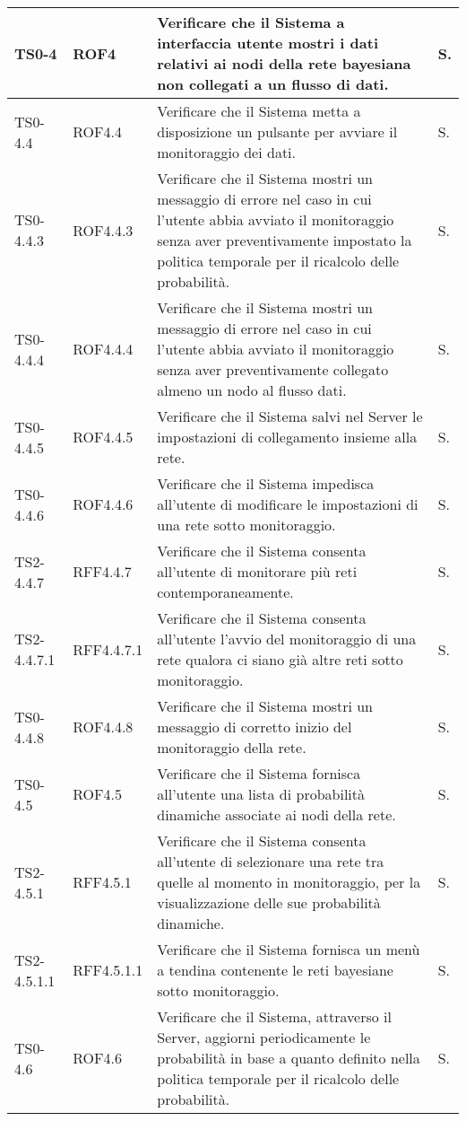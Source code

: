 \begin{longtable}{|C{.15\textwidth}|C{.14\textwidth}|m{.52\textwidth}|m{.08\textwidth}|}
\hline
{}TS0-4 & ROF4 & Verificare che il Sistema a interfaccia utente mostri i dati relativi ai nodi della rete bayesiana non collegati a un flusso di dati. & S. \\
\hline
TS0-4.4 & ROF4.4 & Verificare che il Sistema metta a disposizione un pulsante per avviare il monitoraggio dei dati. & S. \\
\hline
{}TS0-4.4.3 & ROF4.4.3 & Verificare che il Sistema mostri un messaggio di errore nel caso in cui l'utente abbia avviato il monitoraggio senza aver preventivamente impostato la politica temporale per il ricalcolo delle probabilità. & S. \\
\hline
TS0-4.4.4 & ROF4.4.4 & Verificare che il Sistema mostri un messaggio di errore nel caso in cui l'utente abbia avviato il monitoraggio senza aver preventivamente  collegato almeno un nodo al flusso dati. & S. \\
\hline
{}TS0-4.4.5 & ROF4.4.5 & Verificare che il Sistema salvi nel Server le impostazioni di collegamento insieme alla rete. & S. \\
\hline
TS0-4.4.6 & ROF4.4.6 & Verificare che il Sistema impedisca all'utente di modificare le impostazioni di una rete sotto monitoraggio. & S. \\
\hline
{}TS2-4.4.7 & RFF4.4.7 & Verificare che il Sistema consenta all'utente di monitorare più reti contemporaneamente. & S. \\
\hline
TS2-4.4.7.1 & RFF4.4.7.1 & Verificare che il Sistema consenta all'utente l'avvio del monitoraggio di una rete qualora ci siano già altre reti sotto monitoraggio. & S. \\
\hline
{}TS0-4.4.8 & ROF4.4.8 & Verificare che il Sistema mostri un messaggio di corretto inizio del monitoraggio della rete. & S. \\
\hline
TS0-4.5 & ROF4.5 & Verificare che il Sistema fornisca all'utente una lista di probabilità dinamiche associate ai nodi della rete. & S. \\
\hline
{}TS2-4.5.1 & RFF4.5.1 & Verificare che il Sistema consenta all'utente di selezionare una rete tra quelle al momento in monitoraggio, per la visualizzazione delle sue probabilità dinamiche. & S. \\
\hline
TS2-4.5.1.1 & RFF4.5.1.1 & Verificare che il Sistema fornisca un menù a  tendina contenente le reti bayesiane sotto monitoraggio. & S. \\
\hline
{}TS0-4.6 & ROF4.6 & Verificare che il Sistema, attraverso il Server, aggiorni periodicamente le probabilità in base a quanto definito nella politica temporale per il ricalcolo delle probabilità. & S. \\

\end{longtable}
